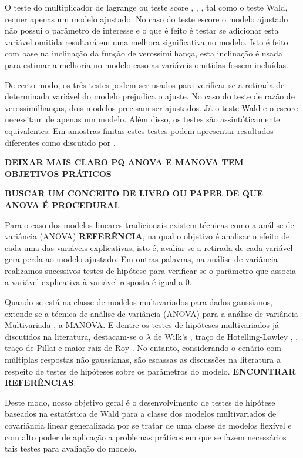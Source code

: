O teste do multiplicador de lagrange ou teste score \citep{score1}, \citep{score2}, \citep{score3}, tal como o teste Wald, requer apenas um modelo ajustado. No caso do teste escore o modelo ajustado não possui o parâmetro de interesse e o que é feito é testar se adicionar esta variável omitida resultará em uma melhora significativa no modelo. Isto é feito com base na inclinação da função de verossimilhança, esta inclinação é usada para estimar a melhoria no modelo caso as variáveis omitidas fossem incluídas.

De certo modo, os três testes podem ser usados para verificar se a retirada de determinada variável do modelo prejudica o ajuste. No caso do teste de razão de verossimilhanças, dois modelos precisam ser ajustados. Já o teste Wald e o escore necessitam de apenas um modelo. Além disso, os testes são assintóticamente equivalentes. Em amostras finitas estes testes podem apresentar resultados diferentes como discutido por \citet{conflict}.

\textbf{DEIXAR MAIS CLARO PQ ANOVA E MANOVA TEM OBJETIVOS PRÁTICOS}

\textbf{BUSCAR UM CONCEITO DE LIVRO OU PAPER DE QUE ANOVA É PROCEDURAL}

Para o caso dos modelos lineares tradicionais existem técnicas como a análise de variância (ANOVA) \textbf{REFERÊNCIA}, na qual o objetivo é analisar o efeito de cada uma das variáveis explicativas, isto é, avaliar se a retirada de cada variável gera perda ao modelo ajustado. Em outras palavras, na análise de variância realizamos sucessivos testes de hipótese para verificar se o parâmetro que associa a variável explicativa à variável resposta é igual a 0.

Quando se está na classe de modelos multivariados para dados gaussianos, extende-se a técnica de análise de variância (ANOVA) para a análise de variância  Multivariada \citep{manova}, a MANOVA. E dentre os testes de hipóteses multivariados já discutidos na literatura, destacam-se o $\lambda$ de Wilk's \citep{wilks}, traço de Hotelling-Lawley \citep{lawley}, \citep{hotelling}, traço de Pillai \citep{pillai} e maior raiz de Roy \citep{roy}. No entanto, considerando o cenário com múltiplas respostas não gaussianas, são escassas as discussões na literatura a respeito de testes de hipóteses sobre os parâmetros do modelo. \textbf{ENCONTRAR REFERÊNCIAS}.

Deste modo, nosso objetivo geral é o desenvolvimento de testes de hipótese baseados na estatística de Wald para a classe dos modelos multivariados de covariância linear generalizada por se tratar de uma classe de modelos flexível e com alto poder de aplicação a problemas práticos em que se fazem necessários tais testes para avaliação do modelo.

